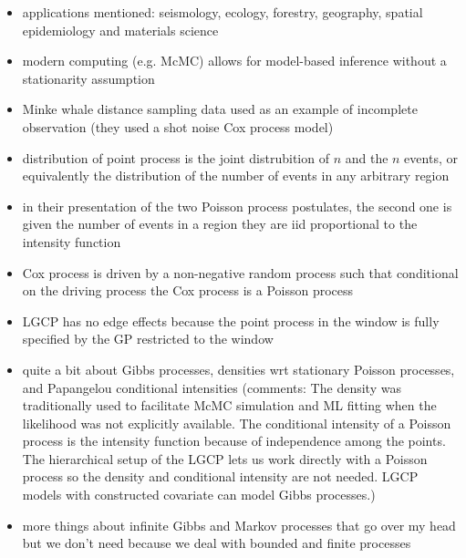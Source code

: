 \documentclass[]{interact}
\begin{document}
\begin{itemize}

\item applications mentioned: seismology, ecology, forestry, geography, spatial
epidemiology and materials science

\item modern computing (e.g. McMC) allows for model-based inference without a
stationarity assumption

\item Minke whale distance sampling data used as an example of incomplete
observation (they used a shot noise Cox process model)

\item distribution of point process is the joint distrubition of \(n\) and
the \(n\) events, or equivalently the distribution of the number of events in
any arbitrary region

\item in their presentation of the two Poisson process postulates, the second
one is given the number of events in a region they are iid proportional to the
intensity function

\item Cox process is driven by a non-negative random process such that
conditional on the driving process the Cox process is a Poisson process

\item LGCP has no edge effects because the point process in the window is
fully specified by the GP restricted to the window

\item quite a bit about Gibbs processes, densities wrt stationary Poisson
processes, and Papangelou conditional intensities (comments: The density was
traditionally used to facilitate McMC simulation and ML fitting when the
likelihood was not explicitly available. The conditional intensity of a
Poisson process is the intensity function because of independence among the
points. The hierarchical setup of the LGCP lets us work directly with a
Poisson process so the density and conditional intensity are not needed. LGCP
models with constructed covariate can model Gibbs processes.)

\item more things about infinite Gibbs and Markov processes that go over my
head but we don't need because we deal with bounded and finite processes

\end{itemize}
\end{document}
